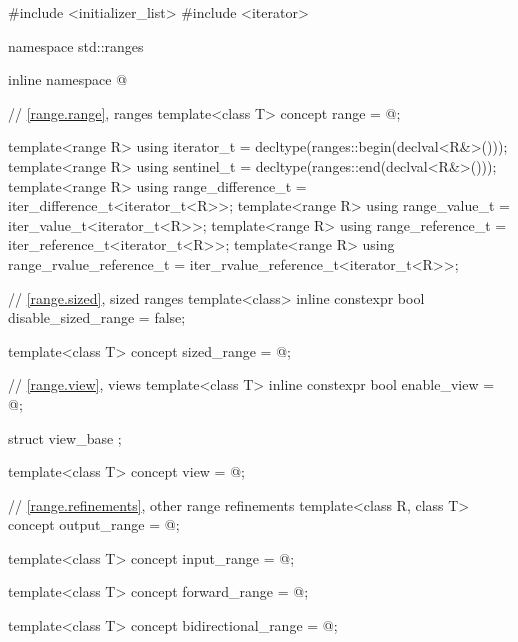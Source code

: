 %
\begin{codeblock}
#include <initializer_list>
#include <iterator>

namespace std::ranges {
  inline namespace @

  // \ref{range.range}, ranges
  template<class T>
    concept range = @\seebelow@;

  template<range R>
    using iterator_t = decltype(ranges::begin(declval<R&>()));
  template<range R>
    using sentinel_t = decltype(ranges::end(declval<R&>()));
  template<range R>
    using range_difference_t = iter_difference_t<iterator_t<R>>;
  template<range R>
    using range_value_t = iter_value_t<iterator_t<R>>;
  template<range R>
    using range_reference_t = iter_reference_t<iterator_t<R>>;
  template<range R>
    using range_rvalue_reference_t = iter_rvalue_reference_t<iterator_t<R>>;

  // \ref{range.sized}, sized ranges
  template<class>
    inline constexpr bool disable_sized_range = false;

  template<class T>
    concept sized_range = @\seebelow@;

  // \ref{range.view}, views
  template<class T>
    inline constexpr bool enable_view = @\seebelow@;

  struct view_base { };

  template<class T>
    concept view = @\seebelow@;

  // \ref{range.refinements}, other range refinements
  template<class R, class T>
    concept output_range = @\seebelow@;

  template<class T>
    concept input_range = @\seebelow@;

  template<class T>
    concept forward_range = @\seebelow@;

  template<class T>
    concept bidirectional_range = @\seebelow@;

}
\end{codeblock}
